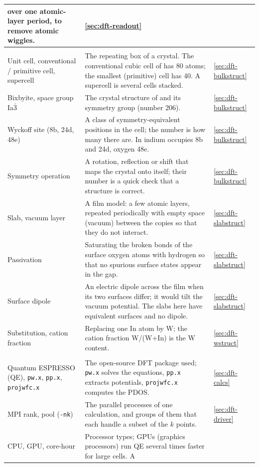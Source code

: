 \begin{small}
\begin{longtable}{@{}>{\raggedright\arraybackslash}p{3.3cm}>{\raggedright\arraybackslash}p{9.0cm}>{\raggedright\arraybackslash}p{1.6cm}@{}}
over one atomic-layer period, to remove atomic wiggles. & \ref{sec:dft-readout} \\
\midrule
\multicolumn{3}{@{}l}{\textit{Describing the material}}\\
Unit cell, conventional / primitive cell, supercell & The repeating box of a crystal. The conventional cubic cell of
\InO{} has 80 atoms; the smallest (primitive) cell has 40. A supercell is several cells stacked. & \ref{sec:dft-bulkstruct} \\
Bixbyite, space group Ia$\bar{3}$ & The crystal structure of \InO{} and its symmetry group (number 206). & \ref{sec:dft-bulkstruct} \\
Wyckoff site (8b, 24d, 48e) & A class of symmetry-equivalent positions in the cell; the number is how many there are.
In \InO{} indium occupies 8b and 24d, oxygen 48e. & \ref{sec:dft-bulkstruct} \\
Symmetry operation & A rotation, reflection or shift that maps the crystal onto itself; their number is a quick check
that a structure is correct. & \ref{sec:dft-bulkstruct} \\
Slab, vacuum layer & A film model: a few atomic layers, repeated periodically with empty space (vacuum) between the
copies so that they do not interact. & \ref{sec:dft-slabstruct} \\
Passivation & Saturating the broken bonds of the surface oxygen atoms with hydrogen so that no spurious surface states
appear in the gap. & \ref{sec:dft-slabstruct} \\
Surface dipole & An electric dipole across the film when its two surfaces differ; it would tilt the vacuum potential.
The slabs here have equivalent surfaces and no dipole. & \ref{sec:dft-slabstruct} \\
Substitution, cation fraction & Replacing one In atom by W; the cation fraction W/(W+In) is the W content. & \ref{sec:dft-wstruct} \\
\midrule
\multicolumn{3}{@{}l}{\textit{Computing}}\\
Quantum ESPRESSO (QE), \texttt{pw.x}, \texttt{pp.x}, \texttt{projwfc.x} & The open-source DFT package used; \texttt{pw.x}
solves the equations, \texttt{pp.x} extracts potentials, \texttt{projwfc.x} computes the PDOS. & \ref{sec:dft-calcs} \\
MPI rank, pool (\texttt{-nk}) & The parallel processes of one calculation, and groups of them that each handle a subset
of the $k$ points. & \ref{sec:dft-driver} \\
CPU, GPU, core-hour & Processor types; GPUs (graphics processors) run QE several times faster for large cells. A

\end{longtable}
\end{small}
